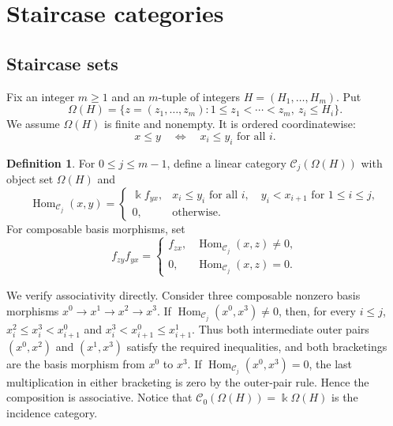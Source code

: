 \documentclass[12pt,a4paper,english,reqno]{amsart}
\theoremstyle{plain}
\theoremstyle{definition}
\newtheorem{definition}[theorem]{Definition}
\newcommand{\kk}{\Bbbk}
\newcommand{\Hom}{\operatorname{Hom}}
\newcommand{\C}{\mathcal C}
\begin{document}
\section{Staircase categories}
\label{sec:staircase}

\subsection{Staircase sets}

Fix an integer $m\geq1$ and an $m$-tuple of integers
$H=(H_1,\ldots,H_m)$.  Put
\begin{equation}
 \Omega(H)=
 \{z=(z_1,\ldots,z_m):
 1\leq z_1<\cdots<z_m,\ z_i\leq H_i\}.
\label{eq:staircase}
\end{equation}
We assume $\Omega(H)$ is finite and nonempty.  It is ordered
coordinatewise:
\[
 x\leq y\quad\Longleftrightarrow\quad x_i\leq y_i
 \text{ for all }i.
\]

\begin{definition}
\label{def:Cj}
For $0\leq j\leq m-1$, define a linear category
$\C_j(\Omega(H))$ with object set $\Omega(H)$ and
\begin{equation}
 \Hom_{\C_j}(x,y)=
 \begin{cases}
 \kk f_{yx},&
 x_i\leq y_i\text{ for all }i,\quad
 y_i<x_{i+1}\text{ for }1\leq i\leq j,\\
 0,&\text{otherwise}.
 \end{cases}
\label{eq:Cj-hom}
\end{equation}
For composable basis morphisms, set
\begin{equation}
 f_{zy}f_{yx}=
 \begin{cases}
 f_{zx},&\Hom_{\C_j}(x,z)\neq0,\\
 0,&\Hom_{\C_j}(x,z)=0.
 \end{cases}
\label{eq:Cj-composition}
\end{equation}
\end{definition}

We verify associativity directly.  Consider three composable nonzero basis
morphisms $x^0\longrightarrow x^1\longrightarrow x^2\longrightarrow x^3$.
If $\Hom_{\C_j}(x^0,x^3)\neq0$, then, for every $i\leq j$, $x_i^2\leq x_i^3<x_{i+1}^0$ and $x_i^3<x_{i+1}^0\leq x_{i+1}^1$.
Thus both intermediate outer pairs $(x^0,x^2)$ and $(x^1,x^3)$
satisfy the required inequalities, and both bracketings are the basis
morphism from $x^0$ to $x^3$.  If
$\Hom_{\C_j}(x^0,x^3)=0$, the last multiplication in either bracketing is
zero by the outer-pair rule.  Hence the composition is associative.  Notice
that $\C_0(\Omega(H))=\kk\Omega(H)$
is the incidence category.
\end{document}
